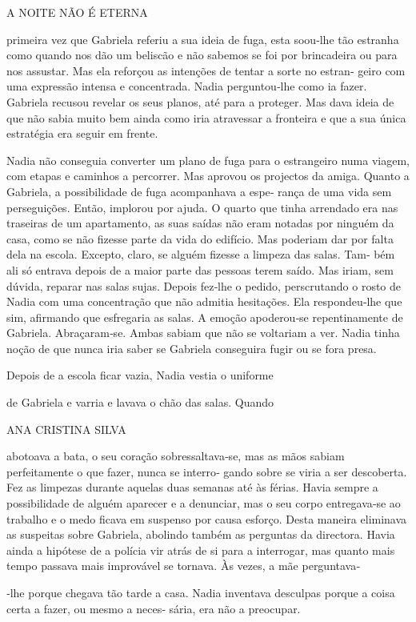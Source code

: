 A NOITE NÃO É ETERNA

primeira vez que Gabriela referiu a sua ideia de fuga, esta soou‑lhe tão
estranha como quando nos dão um beliscão e não sabemos se foi por
brincadeira ou para nos assustar. Mas ela reforçou as intenções de
tentar a sorte no estran‑ geiro com uma expressão intensa e concentrada.
Nadia perguntou‑lhe como ia fazer. Gabriela recusou revelar os seus
planos, até para a proteger. Mas dava ideia de que não sabia muito bem
ainda como iria atravessar a fronteira e que a sua única estratégia era
seguir em frente.

Nadia não conseguia converter um plano de fuga para o estrangeiro numa
viagem, com etapas e caminhos a percorrer. Mas aprovou os projectos da
amiga. Quanto a Gabriela, a possibilidade de fuga acompanhava a espe‑
rança de uma vida sem perseguições. Então, implorou por ajuda. O quarto
que tinha arrendado era nas traseiras de um apartamento, as suas saídas
não eram notadas por ninguém da casa, como se não fizesse parte da vida
do edifício. Mas poderiam dar por falta dela na escola. Excepto, claro,
se alguém fizesse a limpeza das salas. Tam‑ bém ali só entrava depois de
a maior parte das pessoas terem saído. Mas iriam, sem dúvida, reparar
nas salas sujas. Depois fez‑lhe o pedido, perscrutando o rosto de Nadia
com uma concentração que não admitia hesitações. Ela respondeu‑lhe que
sim, afirmando que esfregaria as salas. A emoção apoderou‑se
repentinamente de Gabriela. Abraçaram‑se. Ambas sabiam que não se
voltariam a ver. Nadia tinha noção de que nunca iria saber se Gabriela
conseguira fugir ou se fora presa.

Depois de a escola ficar vazia, Nadia vestia o uniforme

de Gabriela e varria e lavava o chão das salas. Quando

ANA CRISTINA SILVA

abotoava a bata, o seu coração sobressaltava‑se, mas as mãos sabiam
perfeitamente o que fazer, nunca se interro‑ gando sobre se viria a ser
descoberta. Fez as limpezas durante aquelas duas semanas até às férias.
Havia sempre a possibilidade de alguém aparecer e a denunciar, mas o seu
corpo entregava‑se ao trabalho e o medo ficava em suspenso por causa
esforço. Desta maneira eliminava as suspeitas sobre Gabriela, abolindo
também as perguntas da directora. Havia ainda a hipótese de a polícia
vir atrás de si para a interrogar, mas quanto mais tempo passava mais
improvável se tornava. Às vezes, a mãe perguntava‑

‑lhe porque chegava tão tarde a casa. Nadia inventava desculpas porque a
coisa certa a fazer, ou mesmo a neces‑ sária, era não a preocupar.

